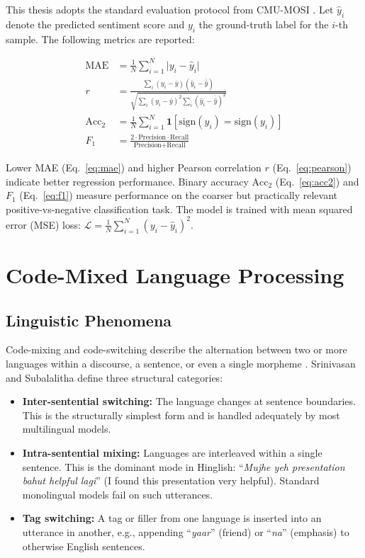 This thesis adopts the standard evaluation protocol from CMU-MOSI \cite{zadeh2016mosi}. Let $\hat{y}_i$ denote the predicted sentiment score and $y_i$ the ground-truth label for the $i$-th sample. The following metrics are reported:

\begin{align}
\text{MAE} &= \frac{1}{N}\sum_{i=1}^{N}\lvert y_i - \hat{y}_i \rvert \label{eq:mae}\\[4pt]
r &= \frac{\sum_i (y_i - \bar{y})(\hat{y}_i - \bar{\hat{y}})}{\sqrt{\sum_i (y_i-\bar{y})^2 \sum_i (\hat{y}_i - \bar{\hat{y}})^2}} \label{eq:pearson}\\[4pt]
\text{Acc}_2 &= \frac{1}{N}\sum_{i=1}^{N}\mathbf{1}[\text{sign}(\hat{y}_i) = \text{sign}(y_i)] \label{eq:acc2}\\[4pt]
F_1 &= \frac{2 \cdot \text{Precision} \cdot \text{Recall}}{\text{Precision} + \text{Recall}} \label{eq:f1}
\end{align}

Lower MAE (Eq.~\ref{eq:mae}) and higher Pearson correlation $r$ (Eq.~\ref{eq:pearson}) indicate better regression performance. Binary accuracy $\text{Acc}_2$ (Eq.~\ref{eq:acc2}) and $F_1$ (Eq.~\ref{eq:f1}) measure performance on the coarser but practically relevant positive-vs-negative classification task. The model is trained with mean squared error (MSE) loss: $\mathcal{L} = \frac{1}{N}\sum_{i=1}^{N}(y_i - \hat{y}_i)^2$.

\section{Code-Mixed Language Processing}

\subsection{Linguistic Phenomena}

Code-mixing and code-switching describe the alternation between two or more languages within a discourse, a sentence, or even a single morpheme \cite{barman2014code}. Srinivasan and Subalalitha \cite{srinivasan2020code} define three structural categories:

\begin{itemize}
    \item \textbf{Inter-sentential switching:} The language changes at sentence boundaries. This is the structurally simplest form and is handled adequately by most multilingual models.
    \item \textbf{Intra-sentential mixing:} Languages are interleaved within a single sentence. This is the dominant mode in Hinglish: ``\textit{Mujhe yeh presentation bahut helpful lagi}'' (I found this presentation very helpful). Standard monolingual models fail on such utterances.
    \item \textbf{Tag switching:} A tag or filler from one language is inserted into an utterance in another, e.g., appending ``\textit{yaar}'' (friend) or ``\textit{na}'' (emphasis) to otherwise English sentences.
\end{itemize}

